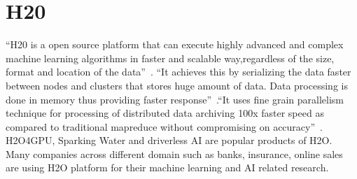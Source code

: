 \section{H20}


``H20 is a open source platform that can execute highly advanced 
and complex machine learning algorithms in faster and scalable 
way,regardless of the size, format and location of the 
data''~\cite{hid-sp18-523-www-h2o}. ``It achieves this by serializing 
the data faster between nodes and clusters that stores huge amount 
of data. Data processing is done in memory thus providing faster 
response''~\cite{hid-sp18-523-www-h2o}.``It uses fine grain parallelism 
technique for processing of distributed data archiving 100x faster 
speed as compared to traditional mapreduce without compromising 
on accuracy''~\cite{hid-sp18-523-www-h2o}. H2O4GPU, Sparking Water
and driverless AI are popular products of H2O. Many companies
across different domain such as banks, insurance, online sales 
are using H2O platform for their machine learning and AI related
research.





